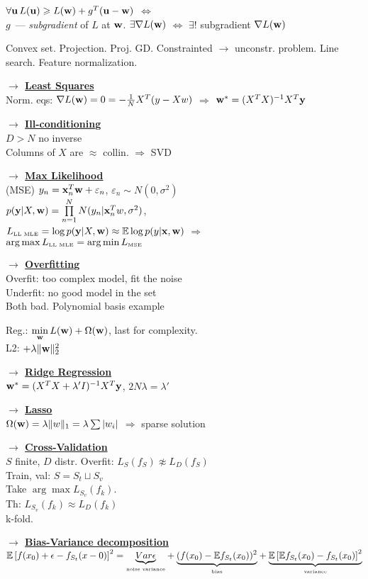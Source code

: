 \documentclass[]{article}
\newcommand{\myvector}[1]{{\bf{#1}}}
\newcommand{\x}{\myvector{x}}
\newcommand{\y}{\myvector{y}}
\newcommand{\w}{\myvector{w}}
\newcommand{\uu}{\myvector{u}}
\newcommand{\underlabel}[2]{\underset{\mbox{\tiny #2}}{\underbrace{#1}}}
\newcommand{\mytitle}[1]{ {\bf $\rightarrow$ \underline{#1}}\\}
\begin{document}
\begin{multicols*}{2}
$\forall\uu\,L(\uu)\geqslant L(\w)+g^T(\uu-\w)$ $\Leftrightarrow$\\
$g$~--- {\em subgradient} of $L$ at $\w$. $\exists \nabla L(\w)$ $\Leftrightarrow$
$\exists!$ subgradient $\nabla L(\w)$

Convex set. Projection. Proj. GD. Constrainted $\rightarrow$ unconstr. problem. Line search. Feature normalization. 

\mytitle{Least Squares}
Norm. eqs: $\nabla L(\w)=0=-\frac{1}{N}X^T(y-Xw)$
$\Rightarrow$ $\w^*=(X^TX)^{-1}X^T\myvector{y}$

\mytitle{Ill-conditioning}
$D>N$ no inverse\\
Columns of $X$ are $\approx$ collin. $\Rightarrow$ SVD

\mytitle{Max Likelihood}
(MSE) $y_n=\x_n^T\w+\varepsilon_n$, $\varepsilon_n\sim N(0, \sigma^2)$\\
$p(\y|X,\w)=\prod\limits_{n=1}^NN(y_n|\x_n^Tw,\sigma^2)$,\\
$L_{\mbox{\tiny LL MLE}}=\log p(\y|X,\w)\approx \mathbb{E}\log p(y|\x,\w)$ $\Rightarrow$\\
$\arg\max L_{\mbox{\tiny LL MLE}}=\arg\min L_{\mbox{\tiny MSE}}$

\mytitle{Overfitting}
Overfit: too complex model, fit the noise\\
Underfit: no good model in the set\\
Both bad. Polynomial basis example

Reg.: $\min\limits_\w L(\w)+\Omega(\w)$, last for complexity.\\
L2: $+\lambda \|\w\|_2^2$

\mytitle{Ridge Regression}
$\w^*=(X^TX+\lambda'I)^{-1}X^T\y$, $2N\lambda=\lambda'$

\mytitle{Lasso}
$\Omega(\w)=\lambda \|w\|_1=\lambda\sum |w_i|$ $\Rightarrow$ sparse solution

\mytitle{Cross-Validation}
$S$ finite, $D$ distr.
Overfit: $L_S(f_S)\not\approx L_D(f_S)$\\
Train, val: $S=S_t\sqcup S_v$\\
Take $\arg\max L_{S_v}(f_k)$.\\
Th: $L_{S_v}(f_k)\approx L_D(f_k)$\\
k-fold.

\mytitle{Bias-Variance decomposition}
$\mathbb{E}\left[f(x_0)+\epsilon-f_{S_t}(x-0)\right]^2=\underlabel{Var\epsilon}{noise variance}+\underlabel{(f(x_0)-\mathbb{E}f_{S_t}(x_0))^2}{bias}+\underlabel{\mathbb{E}\left[\mathbb{E}f_{S_t}(x_0)-f_{S_t}(x_0)\right]^2}{variance}$


\end{multicols*}
\end{document}
